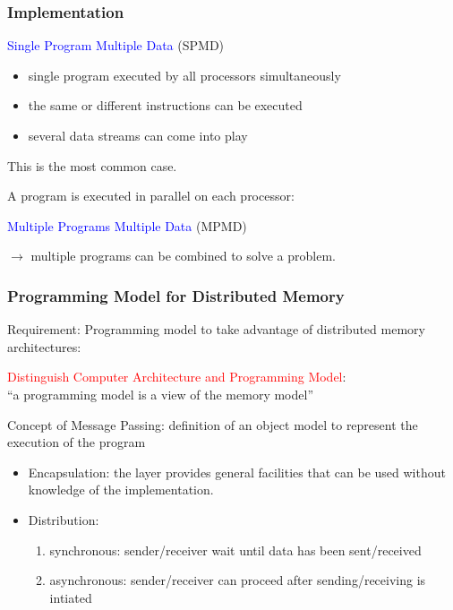 \begin{frame}
  \frametitle{Implementation}

\textcolor{blue}{Single Program Multiple Data} (SPMD)
\begin{itemize}
\item single program executed by all processors simultaneously
\item the same or different instructions can be executed
\item several data streams can come into play
\end{itemize}
This is the most common case. 

\medskip
A program is executed in parallel on each processor:
\begin{center}
    \scalebox{0.8}{}
\end{center}

\bigskip
\textcolor{blue}{Multiple Programs Multiple Data} (MPMD)

\medskip
$\rightarrow$ multiple programs can be combined to solve a problem.

\end{frame}

\begin{frame}
  \frametitle{Programming Model for Distributed Memory}
Requirement: Programming model to take advantage of distributed memory architectures:


\begin{center}
\textcolor{red}{Distinguish Computer Architecture and Programming Model}:\\
``a programming model is a view of the memory model''
\end{center}

\medskip
Concept of Message Passing: definition of an object model to represent the execution of the program

\medskip
\begin{itemize}
\item Encapsulation: the layer provides general facilities that can be used without knowledge of the implementation.
\item Distribution:
\begin{enumerate}
\item synchronous: sender/receiver wait until data has been sent/received
\item asynchronous: sender/receiver can proceed after sending/receiving is intiated 
\end{enumerate}
\end{itemize}
\medskip

\end{frame}

